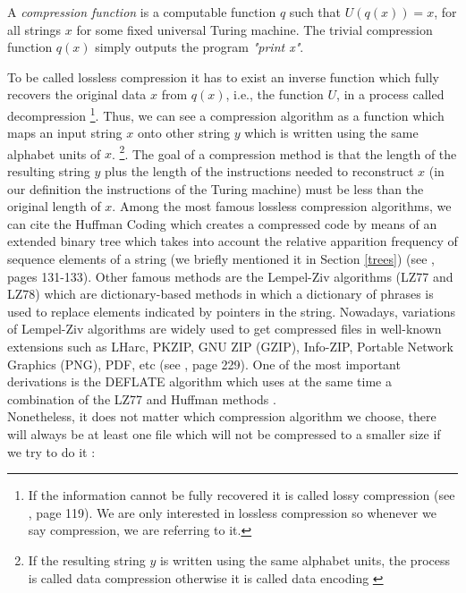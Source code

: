 \begin{defn}
A \textit{compression function} is a computable function $q$ such that $U(q(x))=x$, for all strings $x$ for some fixed universal Turing machine. The trivial compression function $q(x)$ simply outputs the program \textit{"print x"}.
\end{defn}

To be called lossless compression it has to exist an inverse function which fully recovers the original data $x$ from $q(x)$, i.e., the function $U$, in a process called decompression \footnote{If the information cannot be fully recovered it is called lossy compression (see \cite{info_theory}, page 119). We are only interested in lossless compression so whenever we say compression, we are referring to it.}.
Thus, we can see a compression algorithm as a function which maps an input string $x$ onto other string $y$ which is written using the same alphabet units of $x$. \footnote{If the resulting string $y$ is written using the same alphabet units, the process is called data compression otherwise it is called data encoding \cite{decomposition}}. The goal of a compression method is that the length of the resulting string $y$ plus the length of the instructions needed to reconstruct $x$ (in our definition the instructions of the Turing machine) must be less than the original length of $x$. 
Among the most famous lossless compression algorithms, we can cite the Huffman Coding which creates a compressed code by means of an extended binary tree which takes into account the relative apparition frequency of sequence elements of a string (we briefly mentioned it in Section \ref{trees}) (see \cite{info_theory}, pages 131-133). Other famous methods are the Lempel-Ziv algorithms (LZ77 and LZ78) which are dictionary-based methods in which a dictionary of phrases is used to replace elements indicated by pointers in the string. Nowadays, variations of Lempel-Ziv algorithms are widely used to get compressed files in well-known extensions such as LHarc, PKZIP, GNU ZIP (GZIP), Info-ZIP, Portable Network Graphics (PNG), PDF, etc (see \cite{info_theory}, page 229). One of the most important derivations is the DEFLATE algorithm which uses at the same time a combination of the LZ77 and Huffman methods \cite{deflate}.\\

Nonetheless, it does not matter which compression algorithm we choose, there will always be at least one file which will not be compressed to a smaller size if we try to do it \cite{decomposition}:

